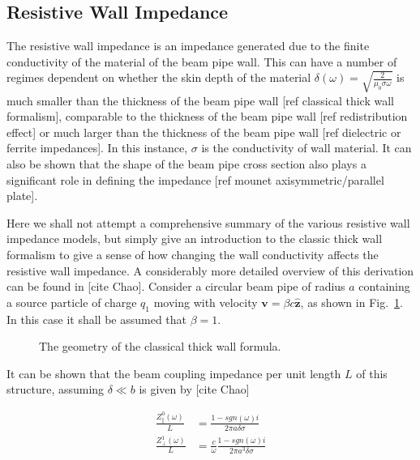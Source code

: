 \subsection{Resistive Wall Impedance}
\label{sec:res_wall_imp}

The resistive wall impedance is an impedance generated due to the finite conductivity of the material of the beam pipe wall. This can have a number of regimes dependent on whether the skin depth of the material $\delta \left( \omega \right) = \sqrt{\frac{2}{\mu_{0} \sigma \omega}}$ is much smaller than the thickness of the beam pipe wall [ref classical thick wall formalism], comparable to the thickness of the beam pipe wall [ref redistribution effect] or much larger than the thickness of the beam pipe wall [ref dielectric or ferrite impedances]. In this instance, $\sigma$ is the conductivity of wall material. It can also be shown that the shape of the beam pipe cross section also plays a significant role in defining the impedance [ref mounet axisymmetric/parallel plate].

Here we shall not attempt a comprehensive summary of the various resistive wall impedance models, but simply give an introduction to the classic thick wall formalism to give a sense of how changing the wall conductivity affects the resistive wall impedance. A considerably more detailed overview of this derivation can be found in [cite Chao]. Consider a circular beam pipe of radius $a$ containing a source particle of charge $q_{1}$ moving with velocity $\mathbf{v} = \beta c \mathbf{\hat{z}}$, as shown in Fig.~\ref{fig:res_wall_diagram}. In this case it shall be assumed that $\beta = 1$.

\begin{figure}

\caption{The geometry of the classical thick wall formula.}
\label{fig:res_wall_diagram}
\end{figure}

It can be shown that the beam coupling impedance per unit length $L$ of this structure, assuming $\delta \ll b$ is given by [cite Chao]

\begin{align}
\frac{Z_{\parallel}^{0}  \left( \omega \right)}{L} &= \frac{1 - sgn \left( \omega \right) i }{2 \pi a \delta \sigma} \\
\frac{Z_{\perp}^{1}  \left( \omega \right)}{L} &= \frac{c}{\omega}\frac{1 - sgn \left( \omega \right) i }{2 \pi a^{3} \delta \sigma}
\end{align}

